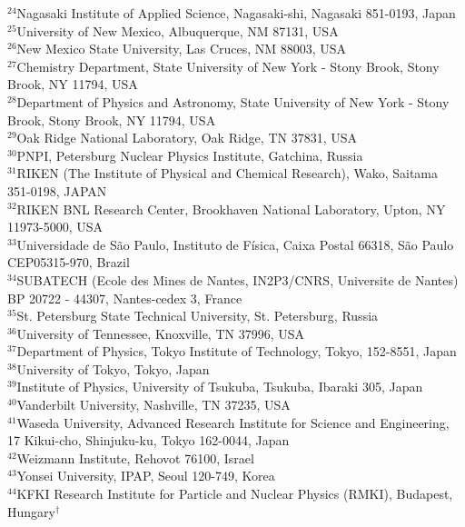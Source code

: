 {$^{24}$Nagasaki Institute of Applied Science, Nagasaki-shi, Nagasaki 851-0193, Japan\\
$^{25}$University of New Mexico, Albuquerque, NM 87131, USA \\
$^{26}$New Mexico State University, Las Cruces, NM 88003, USA\\
$^{27}$Chemistry Department, State University of New York - Stony Brook, Stony Brook, NY 11794, USA\\
$^{28}$Department of Physics and Astronomy, State University of New York - Stony Brook, Stony Brook, NY 11794, USA\\
$^{29}$Oak Ridge National Laboratory, Oak Ridge, TN 37831, USA\\
$^{30}$PNPI, Petersburg Nuclear Physics Institute, Gatchina, Russia\\
$^{31}$RIKEN (The Institute of Physical and Chemical Research), Wako, Saitama 351-0198, JAPAN\\
$^{32}$RIKEN BNL Research Center, Brookhaven National Laboratory, Upton, NY 11973-5000, USA\\
$^{33}$Universidade de S{\~a}o Paulo, Instituto de F\'isica, Caixa Postal 66318, S{\~a}o Paulo CEP05315-970, Brazil\\
$^{34}$SUBATECH (Ecole des Mines de Nantes, IN2P3/CNRS, Universite de Nantes) BP 20722 - 44307, Nantes-cedex 3, France\\
$^{35}$St. Petersburg State Technical University, St. Petersburg, Russia\\
$^{36}$University of Tennessee, Knoxville, TN 37996, USA\\
$^{37}$Department of Physics, Tokyo Institute of Technology, Tokyo, 152-8551, Japan\\
$^{38}$University of Tokyo, Tokyo, Japan\\
$^{39}$Institute of Physics, University of Tsukuba, Tsukuba, Ibaraki 305, Japan\\
$^{40}$Vanderbilt University, Nashville, TN 37235, USA\\
$^{41}$Waseda University, Advanced Research Institute for Science and Engineering, 17  Kikui-cho, Shinjuku-ku, Tokyo 162-0044, Japan\\
$^{42}$Weizmann Institute, Rehovot 76100, Israel\\
$^{43}$Yonsei University, IPAP, Seoul 120-749, Korea\\
$^{44}$KFKI Research Institute for Particle and Nuclear Physics (RMKI), Budapest, Hungary$^{\dagger}$
}

\date{\today}        
\maketitle

